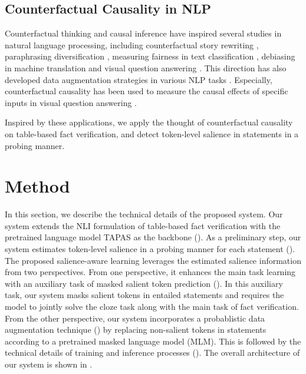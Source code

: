 \documentclass[11pt]{article}
\begin{document}
\subsection{Counterfactual Causality in NLP}
Counterfactual thinking and causal inference have inspired several studies in natural language processing, including
counterfactual story rewriting \cite{qin2019counterfactual},
paraphrasing diversification \cite{park2019paraphrase},
measuring fairness in text classification \cite{garg2019counterfactual},
debiasing in machine translation \cite{saunders2020reducing} and visual question answering \cite{niu2020counterfactual}.
This direction has also developed data augmentation strategies in various NLP tasks \cite{zmigrod2019counterfactual, kaushik2019learning, fu2020counterfactual, zeng2020counterfactual}.
Especially, counterfactual causality has been used to measure the causal effects of specific inputs in visual question answering \cite{niu2020counterfactual}.

Inspired by these applications, we apply the thought of counterfactual causality on table-based fact verification, and detect token-level salience in statements in a probing manner.








 


\section{Method}
In this section, we describe the technical details of the proposed system. 
Our system extends the NLI formulation of table-based fact verification \cite{eisenschlos2020understanding} with the pretrained language model TAPAS as the backbone ().
As a preliminary step, our system estimates token-level salience in a probing manner for each statement (). 
The proposed salience-aware learning leverages the estimated salience information from two perspectives.
From one perspective, it enhances the main task learning with an auxiliary task of masked salient token prediction (). 
In this auxiliary task, our system masks salient tokens in entailed statements and requires the model to jointly solve the cloze task along with the main task of fact verification.
From the other perspective, our system incorporates a probablistic data augmentation technique () by replacing non-salient tokens in statements according to a pretrained masked language model (MLM). 
This is followed by the technical details of training and inference processes ().
The overall architecture of our system is shown in .
\end{document}
